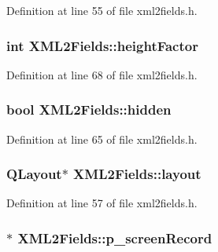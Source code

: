 Definition at line 55 of file xml2fields.h.

\hypertarget{classXML2Fields_a26ed37a4d7fb8cd65360ac174e12dd87}{
\subsubsection[{heightFactor}]{\setlength{\rightskip}{0pt plus 5cm}int {\bf XML2Fields::heightFactor}}}
\label{classXML2Fields_a26ed37a4d7fb8cd65360ac174e12dd87}


Definition at line 68 of file xml2fields.h.

\hypertarget{classXML2Fields_a08d0d38fbb8a0273ec6b94f05f5061b9}{
\subsubsection[{hidden}]{\setlength{\rightskip}{0pt plus 5cm}bool {\bf XML2Fields::hidden}}}
\label{classXML2Fields_a08d0d38fbb8a0273ec6b94f05f5061b9}


Definition at line 65 of file xml2fields.h.

\hypertarget{classXML2Fields_a602aa9a9339f73cf633ed6c1d26385f8}{
\subsubsection[{layout}]{\setlength{\rightskip}{0pt plus 5cm}QLayout$\ast$ {\bf XML2Fields::layout}}}
\label{classXML2Fields_a602aa9a9339f73cf633ed6c1d26385f8}


Definition at line 57 of file xml2fields.h.

\hypertarget{classXML2Fields_a520c208c5d9f130f7e534443ec045297}{
\subsubsection[{p\_\-screenRecord}]{$\ast$ {\bf XML2Fields::p\_\-screenRecord}}}
\label{classXML2Fields_a520c208c5d9f130f7e534443ec045297}


